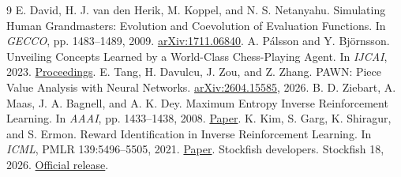 \documentclass[11pt]{article}
\begin{document}
\begin{thebibliography}{9}\small
{} E. David, H. J. van den Herik, M. Koppel, and N. S. Netanyahu. Simulating Human Grandmasters: Evolution and Coevolution of Evaluation Functions. In \emph{GECCO}, pp. 1483--1489, 2009. \href{https://arxiv.org/abs/1711.06840}{arXiv:1711.06840}.
 A. P\'alsson and Y. Bj\"ornsson. Unveiling Concepts Learned by a World-Class Chess-Playing Agent. In \emph{IJCAI}, 2023. \href{https://www.ijcai.org/proceedings/2023/541}{Proceedings}.
 E. Tang, H. Davulcu, J. Zou, and Z. Zhang. PAWN: Piece Value Analysis with Neural Networks. \href{https://arxiv.org/abs/2604.15585}{arXiv:2604.15585}, 2026.
 B. D. Ziebart, A. Maas, J. A. Bagnell, and A. K. Dey. Maximum Entropy Inverse Reinforcement Learning. In \emph{AAAI}, pp. 1433--1438, 2008. \href{https://www.cs.cmu.edu/~bziebart/publications/maximum-entropy-inverse-reinforcement-learning.html}{Paper}.
 K. Kim, S. Garg, K. Shiragur, and S. Ermon. Reward Identification in Inverse Reinforcement Learning. In \emph{ICML}, PMLR 139:5496--5505, 2021. \href{https://proceedings.mlr.press/v139/kim21c.html}{Paper}.
 Stockfish developers. Stockfish 18, 2026. \href{https://github.com/official-stockfish/Stockfish/releases/tag/sf_18}{Official release}.
\end{thebibliography}
\end{document}
